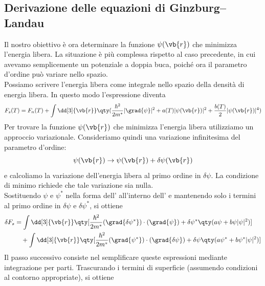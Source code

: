 \subsection{Derivazione delle equazioni di Ginzburg--Landau}
Il nostro obiettivo è ora determinare la funzione $\psi(\vb{r})$ che minimizza l'energia libera. La situazione è più complessa rispetto al caso precedente, in cui avevamo semplicemente un potenziale a doppia buca, poiché ora il parametro d'ordine può variare nello spazio.\\
Possiamo scrivere l'energia libera come integrale nello spazio della densità di energia libera. In questo modo l'espressione  diventa
\begin{equation}
   F_s(T)
   = F_n(T) + \int \dd[3]{\vb{r}} \qty(
   \frac{\hbar^2}{2m^*} |\grad{\psi}|^2
   + a(T) |\psi(\vb{r})|^2
   + \frac{b(T)}{2} |\psi(\vb{r})|^4
   )
   \label{eq:differenza_energie_libere_integrata}
\end{equation}
Per trovare la funzione $\psi(\vb{r})$ che minimizza l'energia libera utilizziamo un approccio variazionale. Consideriamo quindi una variazione infinitesima del parametro d'ordine:
\begin{equation}
   \psi(\vb{r})
   \to \psi(\vb{r}) + \delta \psi(\vb{r})
   \label{eq:variazione_parametro_dordine}
\end{equation}
e calcoliamo la variazione dell'energia libera al primo ordine in $\delta\psi$. La condizione di minimo richiede che tale variazione sia nulla.\\
Sostituendo $\psi$ e $\psi^*$ nella forma dell' all'interno dell' e mantenendo solo i termini al primo ordine in $\delta\psi$ e $\delta\psi^*$, si ottiene
\begin{equation*}
   \begin{split}
      \delta F_s
      &= \int \dd[3]{\vb{r}} \qty[
      \frac{\hbar^2}{2m^*} (\grad{\delta \psi^*}) \cdot (\grad{\psi})
      + \delta \psi^* \qty( a\psi + b \psi |\psi|^2 )
      ]
      \\
      &\quad + \int \dd[3]{\vb{r}} \qty[
      \frac{\hbar^2}{2m^*} (\grad{\psi^*}) \cdot (\grad{\delta \psi})
      + \delta \psi \qty( a\psi^* + b \psi^* |\psi|^2 )
      ]
   \end{split}
\end{equation*}
Il passo successivo consiste nel semplificare queste espressioni mediante integrazione per parti. Trascurando i termini di superficie (assumendo condizioni al contorno appropriate), si ottiene

